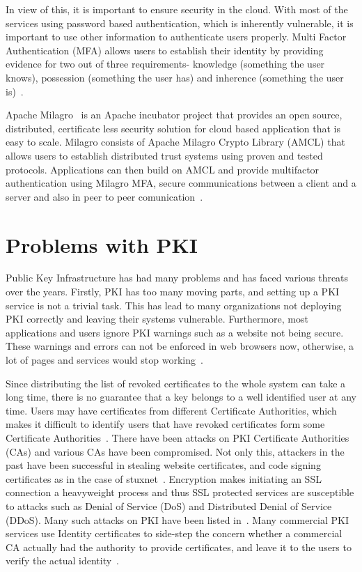 In view of this, it is important to ensure security in the cloud. With
most of the services using password based authentication, which is
inherently vulnerable, it is important to use other information to
authenticate users properly. Multi Factor Authentication (MFA) allows
users to establish their identity by providing evidence for two out of
three requirements- knowledge (something the user knows), possession
(something the user has) and inherence (something the user
is)~\cite{hid-sp18-503-centrify-mfa}.

Apache Milagro~\cite{hid-sp18-503-milagro-website} is an Apache
incubator project that provides an open source, distributed,
certificate less security solution for cloud based application that is
easy to scale. Milagro consists of Apache Milagro Crypto Library
(AMCL) that allows users to establish distributed trust systems using
proven and tested protocols. Applications can then build on AMCL and
provide multifactor authentication using Milagro MFA, secure
communications between a client and a server and also in peer to peer
comunication~\cite{hid-sp18-503-milagro-docs-overview}.



\section{Problems with PKI}
Public Key Infrastructure has had many problems and has faced various
threats over the years.  Firstly, PKI has too many moving parts, and
setting up a PKI service is not a trivial task. This has lead to many
organizations not deploying PKI correctly and leaving their systems
vulnerable. Furthermore, most applications and users ignore PKI
warnings such as a website not being secure. These warnings and errors
can not be enforced in web browsers now, otherwise, a lot of pages and
services would stop working~\cite{hid-sp18-503-cso-pki-problems}.

Since distributing the list of revoked certificates to the whole
system can take a long time, there is no guarantee that a key belongs
to a well identified user at any time. Users may have certificates
from different Certificate Authorities, which makes it difficult to
identify users that have revoked certificates form some Certificate
Authorities~\cite{hid-sp18-503-distlab-pki-problems}.  There have been
attacks on PKI Certificate Authorities (CAs) and various CAs have been
compromised. Not only this, attackers in the past have been successful
in stealing website certificates, and code signing certificates as in
the case of
stuxnet~\cite{hid-sp18-503-securityweek-ssl-threats}. Encryption makes
initiating an SSL connection a heavyweight process and thus SSL
protected services are susceptible to attacks such as Denial of
Service (DoS) and Distributed Denial of Service (DDoS). Many such
attacks on PKI have been listed
in~\cite{hid-sp18-503-cacert-wiki-pki-history}.  Many commercial PKI
services use Identity certificates to side-step the concern whether a
commercial CA actually had the authority to provide certificates, and
leave it to the users to verify the actual
identity~\cite{hid-sp18-503-ten-pki-risks}.

